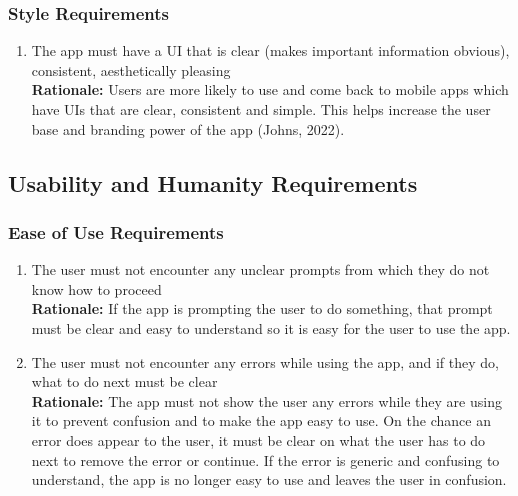 \documentclass[]{article}
\begin{document}
\subsubsection{Style Requirements}
\label{ssub:style_requirements}
\begin{enumerate}[{LF-S}1. ]
	\item The app must have a UI that is clear (makes important information obvious), consistent, aesthetically pleasing \\
	{\bf Rationale:} Users are more likely to use and come back to mobile apps which have UIs that are clear, consistent and simple. This helps increase the user base and branding power of the app (Johns, 2022). 
\end{enumerate}


\subsection{Usability and Humanity Requirements}
\label{sub:usability_and_humanity_requirements}

\subsubsection{Ease of Use Requirements}
\label{ssub:ease_of_use_requirements}
\begin{enumerate}[{UH-EOU}1. ]
	\item The user must not encounter any unclear prompts from which they do not know how to proceed \\
	{\bf Rationale:} If the app is prompting the user to do something, that prompt must be clear and easy to understand so it is easy for the user to use the app.
	\item The user must not encounter any errors while using the app, and if they do, what to do next must be clear \\
	{\bf Rationale:} The app must not show the user any errors while they are using it to prevent confusion and to make the app easy to use. On the chance an error does appear to the user, it must be clear on what the user has to do next to remove the error or continue. If the error is generic and confusing to understand, the app is no longer easy to use and leaves the user in confusion.
\end{enumerate}
\end{document}
